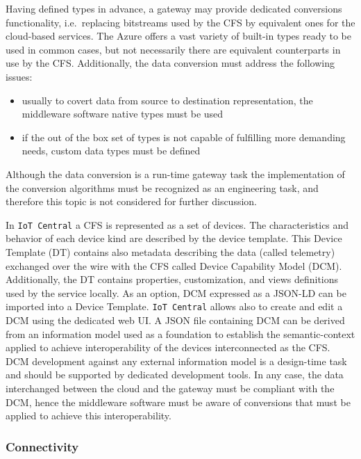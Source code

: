 \documentclass{jacsart}
\providecommand{\tightlist} { \setlength{\itemsep}{0pt}\setlength{\parskip}{0pt}}
\begin{document}
Having defined types in advance, a gateway may provide dedicated conversions functionality, i.e.~replacing bitstreams used by the CFS by equivalent ones for the cloud-based services. The Azure offers a vast variety of built-in types ready to be used in common cases, but not necessarily there are equivalent counterparts in use by the CFS. Additionally, the data conversion must address the following issues:

\begin{itemize}
      \tightlist
      \item
            usually to covert data from source to destination representation, the
            middleware software native types must be used
      \item
            if the out of the box set of types is not capable of fulfilling more
            demanding needs, custom data types must be defined
\end{itemize}

Although the data conversion is a run-time gateway task the
implementation of the conversion algorithms must be recognized as an
engineering task, and therefore this topic is not considered for further
discussion.

In \texttt{IoT\ Central} a CFS is represented as a set
of devices. The characteristics and behavior of each device kind are
described by the device template. This Device Template (DT) contains
also metadata describing the data (called telemetry) exchanged over the
wire with the CFS called Device Capability Model
(DCM). Additionally, the DT contains properties, customization, and
views definitions used by the service locally. As an option, DCM
expressed as a JSON-LD can be imported into a Device Template.
\texttt{IoT\ Central} allows also to create and edit a DCM using the
dedicated web UI. A JSON file containing DCM can be derived from an
information model used as a foundation to establish the semantic-context
applied to achieve interoperability of the devices interconnected as the
CFS. DCM development against any external information
model is a design-time task and should be supported by dedicated
development tools. In any case, the data interchanged between the cloud
and the gateway must be compliant with the DCM, hence the middleware
software must be aware of conversions that must be applied to achieve
this interoperability.

\hypertarget{connectivity}{%
      \subsubsection{Connectivity}\label{connectivity}}
\end{document}
